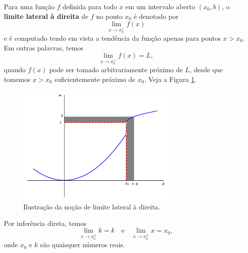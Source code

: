 Para uma função $f$ definida para todo $x$ em um intervalo aberto $(x_0, b)$, o {\bf limite lateral à direita} de $f$ no ponto $x_0$ é denotado por
\begin{equation}
  \lim_{x\to x_0^+} f(x)
\end{equation}
e é computado tendo em vista a tendência da função apenas para pontos $x>x_0$. Em outras palavras, temos
\begin{equation}
  \lim_{x\to x_0^+} f(x) = L,
\end{equation}
quando $f(x)$ pode ser tomado arbitrariamente próximo de $L$, desde que tomemos $x>x_0$ suficientemente próximo de $x_0$. Veja a Figura \ref{fig:lim_dir}.

\begin{figure}[H]
  \centering
  \includegraphics[width=0.7\textwidth]{./cap_lim/dados/fig_lim_dir/fig_lim_dir}
  \caption{Ilustração da noção de limite lateral à direita.}
  \label{fig:lim_dir}
\end{figure}

\begin{obs}
  Por inferência direta, temos
  \begin{equation}
    \lim_{x\to x_0^{\pm}} k = k\quad\text{e}\quad\lim_{x\to x_0^{\pm}} x = x_0,
  \end{equation}
  onde $x_0$ e $k$ são quaisquer números reais.
\end{obs}

